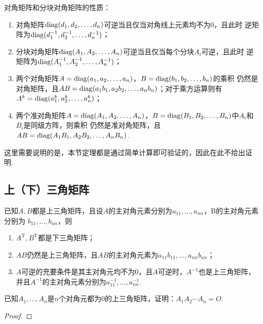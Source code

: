 \begin{theorem}
    对角矩阵和分块对角矩阵的性质：
    \begin{enumerate}
        \item 对角矩阵$\operatorname{diag}(d_1,d_2,\ldots,d_n)$可逆当且仅当对角线上元素均不为0，且此时
        逆矩阵为$\operatorname{diag}(d_1^{-1},d_2^{-1},\ldots,d_n^{-1})$；
        \item 分块对角矩阵$\operatorname{diag}(A_1,A_2,\ldots,A_n)$可逆当且仅当每个分块$A_i$可逆，且此时
        逆矩阵为$\operatorname{diag}(A_1^{-1},A_2^{-1},\ldots,A_n^{-1})$；
        \item 两个对角矩阵$A=\operatorname{diag}(a_1,a_2,\ldots,a_n)$，$B=\operatorname{diag}(b_1,b_2,\ldots,b_n)$的乘积
        仍然是对角矩阵，且$AB=\operatorname{diag}(a_1b_1,a_2b_2,\ldots,a_nb_n)$；对于乘方运算则有$A^k=\operatorname{diag}(a_1^k,a_2^k,\ldots,a_n^k)$；
        \item 两个准对角矩阵$A=\operatorname{diag}(A_1,A_2,\ldots,A_n)$，$B=\operatorname{diag}(B_1,B_2,\ldots,B_n)$中$A_i$和$B_i$是同级方阵，则乘积
        仍然是准对角矩阵，且$AB=\operatorname{diag}(A_1B_1,A_2B_2,\ldots,A_nB_n)$.
    \end{enumerate}
\end{theorem}

这里需要说明的是，本节定理都是通过简单计算即可验证的，因此在此不给出证明.

\subsection{上（下）三角矩阵}
\begin{theorem}
    已知$A,B$都是上三角矩阵，且设$A$的主对角元素分别为$a_{11},\ldots,a_{nn}$，B的主对角元素分别为
    $b_{11},\ldots,b_{nn}$，则
    \begin{enumerate}
        \item $A^{\mathrm{T}}, B^\mathrm{T}$都是下三角矩阵；

        \item $AB$仍然是上三角矩阵，且$AB$的主对角元素为$a_{11}b_{11},\ldots,a_{nn}b_{nn}$；

        \item $A$可逆的充要条件是其主对角元均不为0，且$A$可逆时，$A^{-1}$也是上三角矩阵，并且$A^{-1}$的主对角元素分别为$a_{11}^{-1},\ldots,a_{nn}^{-1}$.
    \end{enumerate}
\end{theorem}

\begin{example}
    已知$A_1,\ldots,A_n$是$n$个对角元都为0的上三角矩阵，证明：$A_1A_2\cdots A_n=O$.
\end{example}
\begin{proof}
    
\end{proof}

